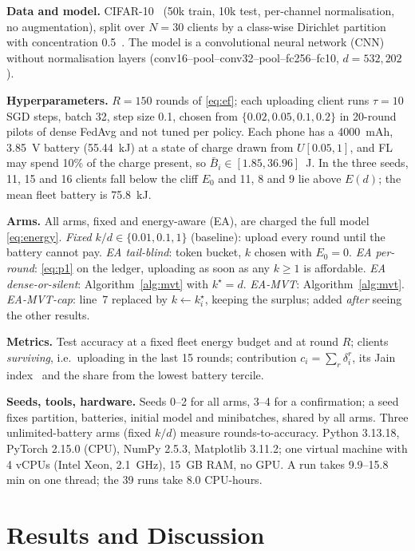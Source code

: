 \documentclass[conference,a4paper]{IEEEtran}
\newcommand{\Ez}{E_0}
\newcommand{\kst}{k^\star}
\newcommand{\Bbar}{\bar{B}}
\begin{document}
\textbf{Data and model.} CIFAR-10~\cite{krizhevsky2009} (50k train, 10k test, per-channel normalisation, no augmentation), split over $N=30$ clients by a class-wise Dirichlet partition with concentration 0.5~\cite{hsu2019}. The model is a convolutional neural network (CNN) without normalisation layers (conv16--pool--conv32--pool--fc256--fc10, $d=532{,}202$).

\textbf{Hyperparameters.} $R=150$ rounds of \eqref{eq:ef}; each uploading client runs $\tau=10$ SGD steps, batch 32, step size 0.1, chosen from $\{0.02,0.05,0.1,0.2\}$ in 20-round pilots of dense FedAvg and not tuned per policy. Each phone has a 4000~mAh, 3.85~V battery (55.44~kJ) at a state of charge drawn from $U[0.05,1]$, and FL may spend 10\% of the charge present, so $\Bbar_i\in[1.85,36.96]$~J. In the three seeds, 11, 15 and 16 clients fall below the cliff $\Ez$ and 11, 8 and 9 lie above $E(d)$; the mean fleet battery is 75.8~kJ.

\textbf{Arms.} All arms, fixed and energy-aware (EA), are charged the full model \eqref{eq:energy}. \emph{Fixed} $k/d\in\{0.01,0.1,1\}$ (baseline): upload every round until the battery cannot pay. \emph{EA tail-blind}: token bucket, $k$ chosen with $\Ez=0$. \emph{EA per-round}: \eqref{eq:p1} on the ledger, uploading as soon as any $k\ge1$ is affordable. \emph{EA dense-or-silent}: Algorithm~\ref{alg:mvt} with $\kst=d$. \emph{EA-MVT}: Algorithm~\ref{alg:mvt}. \emph{EA-MVT-cap}: line~7 replaced by $k\gets\kst_i$, keeping the surplus; added \emph{after} seeing the other results.

\textbf{Metrics.} Test accuracy at a fixed fleet energy budget and at round $R$; clients \emph{surviving}, i.e.\ uploading in the last 15 rounds; contribution $c_i=\sum_r\delta_i^r$, its Jain index~\cite{jain1984} and the share from the lowest battery tercile.

\textbf{Seeds, tools, hardware.} Seeds 0--2 for all arms, 3--4 for a confirmation; a seed fixes partition, batteries, initial model and minibatches, shared by all arms. Three unlimited-battery arms (fixed $k/d$) measure rounds-to-accuracy. Python 3.13.18, PyTorch 2.15.0 (CPU), NumPy 2.5.3, Matplotlib 3.11.2; one virtual machine with 4 vCPUs (Intel Xeon, 2.1~GHz), 15~GB RAM, no GPU. A run takes 9.9--15.8 min on one thread; the 39 runs take 8.0 CPU-hours.

\section{Results and Discussion}
\label{sec:results}
\end{document}
